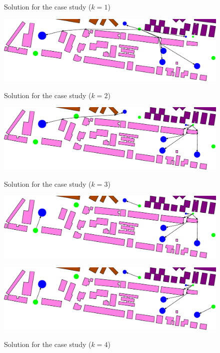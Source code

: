 \documentclass[a4paper,  review, authoryear, 1p.]{elsarticle}
\begin{document}
{		
		\begin{figure}[H]
			\centering
			\caption{Solution for the case study ($k=1$)}
			\includegraphics[width=0.6\linewidth]{figures/solution1}
			\label{fig:solution1}
			\caption{Solution for the case study ($k=2$)}
			\includegraphics[width=0.6\linewidth]{figures/solution2}
			\label{fig:solution2}
			\caption{Solution for the case study ($k=3$)}
			\includegraphics[width=0.6\linewidth]{figures/solution3}
			\label{fig:solution3}
			\caption{Solution for the case study ($k=4$)}
			\includegraphics[width=0.6\linewidth]{figures/solution4}
			\label{fig:solution4}
		\end{figure}


		}
		
		
\end{document}
